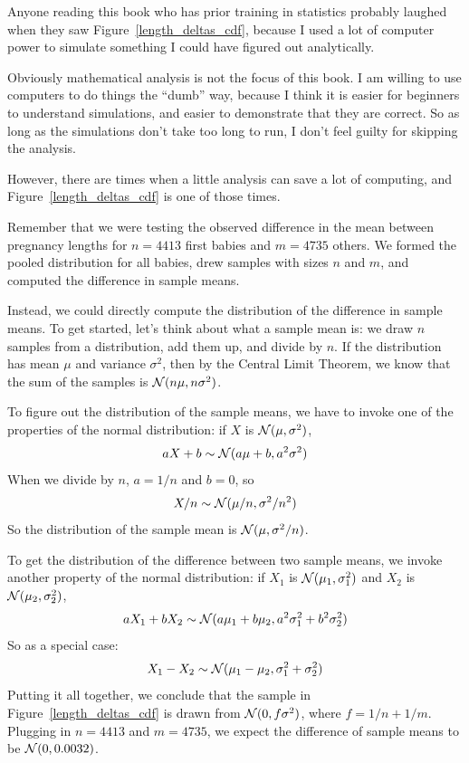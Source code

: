 \documentclass[12pt]{book}
\begin{document}
Anyone reading this book who has prior training in statistics probably
laughed when they saw Figure~\ref{length_deltas_cdf}, because I used a
lot of computer power to simulate something I could have figured out
analytically.



Obviously mathematical analysis is not the focus of this book.  I am
willing to use computers to do things the ``dumb'' way, because I
think it is easier for beginners to understand simulations, and easier
to demonstrate that they are correct.  So as long as the simulations
don't take too long to run, I don't feel guilty for skipping the
analysis.

However, there are times when a little analysis can save a lot of
computing, and Figure~\ref{length_deltas_cdf} is one of those times.


Remember that we were testing the observed difference in the mean between
pregnancy lengths for $n=4413$ first babies and $m=4735$ others.  We formed
the pooled distribution for all babies, drew samples with sizes $n$ and
$m$, and computed the difference in sample means.


Instead, we could directly compute the distribution of the difference
in sample means.  To get started, let's think about what a sample mean
is: we draw $n$ samples from a distribution, add them up, and
divide by $n$.  If the distribution has mean $\mu$ and variance
$\sigma^2$, then by the Central Limit Theorem, we know that the sum of
the samples is $\mathcal{N} (n \mu, n \sigma^2)$.


To figure out the distribution of the sample means, we have to invoke
one of the properties of the normal distribution: if $X$ is
$\mathcal{N} (\mu, \sigma^2)$,
%
\[ aX + b \sim \mathcal{N} (a \mu + b, a^2 \sigma^2) \]
%
When we divide by $n$, $a=1/n$ and $b=0$, so
%
\[ X/n \sim \mathcal{N} (\mu / n, \sigma^2/ n^2) \]
%
So the distribution of the sample mean is $\mathcal{N} (\mu, \sigma^2/n)$.

To get the distribution of the difference between two sample means,
we invoke another property of the normal distribution: if $X_1$ is
$\mathcal{N} (\mu_1, \sigma_1^2)$ and $X_2$ is
$\mathcal{N} (\mu_2, \sigma_2^2)$,
%
\[ aX_1 + bX_2 \sim \mathcal{N} (a\mu_1 + b\mu_2, 
                                 a^2\sigma_1^2 + b^2\sigma_2^2) \]
%
So as a special case:
%
\[ X_1 - X_2 \sim \mathcal{N} (\mu_1 - \mu_2, 
                               \sigma_1^2 + \sigma_2^2) \]
%
Putting it all together, we conclude that the sample in
Figure~\ref{length_deltas_cdf} is drawn from 
$\mathcal{N} (0, f \sigma^2)$, where $f = 1/n + 1/m$.  Plugging in
$n=4413$ and $m=4735$, we expect the difference of sample means to be
$\mathcal{N} (0, 0.0032)$.
\end{document}
